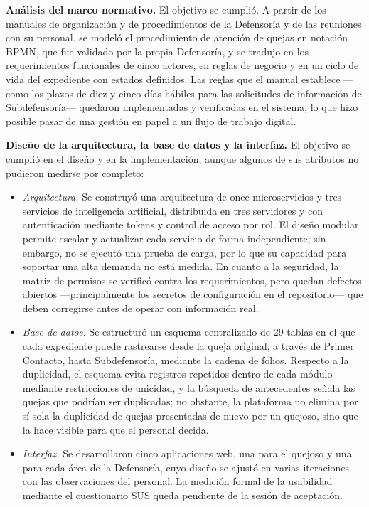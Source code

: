 \textbf{Análisis del marco normativo.} El objetivo se cumplió. A partir de los manuales de organización y de procedimientos de la Defensoría y de las reuniones con su personal, se modeló el procedimiento de atención de quejas en notación BPMN, que fue validado por la propia Defensoría, y se tradujo en los requerimientos funcionales de cinco actores, en reglas de negocio y en un ciclo de vida del expediente con estados definidos. Las reglas que el manual establece ---como los plazos de diez y cinco días hábiles para las solicitudes de información de Subdefensoría--- quedaron implementadas y verificadas en el sistema, lo que hizo posible pasar de una gestión en papel a un flujo de trabajo digital.

\textbf{Diseño de la arquitectura, la base de datos y la interfaz.} El objetivo se cumplió en el diseño y en la implementación, aunque algunos de sus atributos no pudieron medirse por completo:

\begin{itemize}
	\item \textit{Arquitectura.} Se construyó una arquitectura de once microservicios y tres servicios de inteligencia artificial, distribuida en tres servidores y con autenticación mediante tokens y control de acceso por rol. El diseño modular permite escalar y actualizar cada servicio de forma independiente; sin embargo, no se ejecutó una prueba de carga, por lo que su capacidad para soportar una alta demanda no está medida. En cuanto a la seguridad, la matriz de permisos se verificó contra los requerimientos, pero quedan defectos abiertos ---principalmente los secretos de configuración en el repositorio--- que deben corregirse antes de operar con información real.
	\item \textit{Base de datos.} Se estructuró un esquema centralizado de 29 tablas en el que cada expediente puede rastrearse desde la queja original, a través de Primer Contacto, hasta Subdefensoría, mediante la cadena de folios. Respecto a la duplicidad, el esquema evita registros repetidos dentro de cada módulo mediante restricciones de unicidad, y la búsqueda de antecedentes señala las quejas que podrían ser duplicadas; no obstante, la plataforma no elimina por sí sola la duplicidad de quejas presentadas de nuevo por un quejoso, sino que la hace visible para que el personal decida.
	\item \textit{Interfaz.} Se desarrollaron cinco aplicaciones web, una para el quejoso y una para cada área de la Defensoría, cuyo diseño se ajustó en varias iteraciones con las observaciones del personal. La medición formal de la usabilidad mediante el cuestionario SUS queda pendiente de la sesión de aceptación.
\end{itemize}

